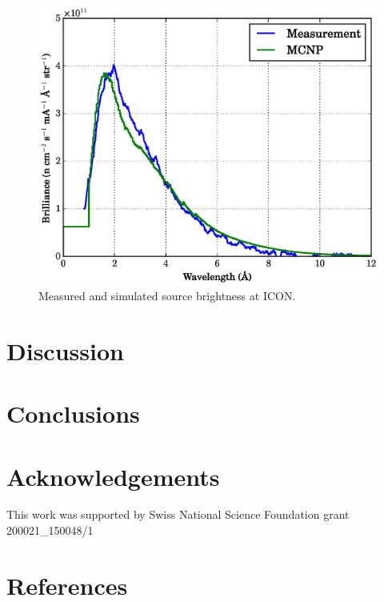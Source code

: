 \documentclass[preprint,12pt]{elsarticle}
\begin{document}
\begin{figure}[h!] 
  \centering
    \includegraphics[width=\columnwidth]{graphics/brightness.eps}
     \caption{Measured and simulated source brightness at ICON. \label{fig:brightness} }
\end{figure}

\section{Discussion}
\label{sec:discussion}



\section{Conclusions}
\label{sec:conclusions}



\section*{Acknowledgements}
\label{sec:ack}

This work was supported by Swiss National Science Foundation grant 200021\_150048/1


\section*{References}


\end{document}
